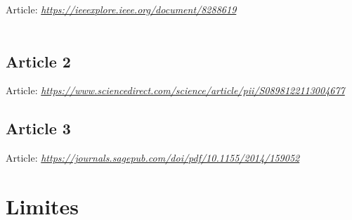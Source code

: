 \documentclass[12pt]{article}
\begin{document}
Article: \textit{\url{https://ieeexplore.ieee.org/document/8288619}}
\\\\



\subsection{Article 2}

Article: \textit{\url{https://www.sciencedirect.com/science/article/pii/S0898122113004677}}

\subsection{Article 3}

Article: \textit{\url{https://journals.sagepub.com/doi/pdf/10.1155/2014/159052}}

\section{Limites}
\end{document}
